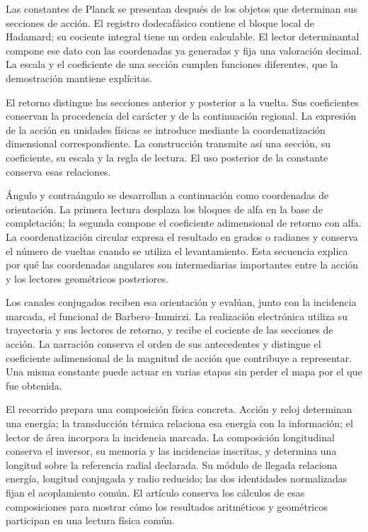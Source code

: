 
Las constantes de Planck se presentan después de los objetos que
determinan sus secciones de acción. El registro dodecafásico contiene el
bloque local de Hadamard; su cociente integral tiene un orden calculable.
El lector determinantal compone ese dato con las coordenadas ya generadas
y fija una valoración decimal. La escala y el coeficiente de una sección
cumplen funciones diferentes, que la demostración mantiene explícitas.

El retorno distingue las secciones anterior y posterior a la vuelta.
Sus coeficientes conservan la procedencia del carácter y de la
continuación regional. La expresión de la acción en unidades físicas
se introduce mediante la coordenatización dimensional correspondiente. La
construcción transmite así una sección, su coeficiente, su escala y la
regla de lectura. El uso posterior de la constante conserva esas
relaciones.

Ángulo y contraángulo se desarrollan a continuación como coordenadas de
orientación. La primera lectura desplaza los bloques de alfa en la base
de completación; la segunda compone el coeficiente adimensional de
retorno con alfa. La coordenatización circular expresa el resultado en grados o
radianes y conserva el número de vueltas cuando se utiliza el
levantamiento. Esta secuencia explica por qué las coordenadas angulares
son intermediarias importantes entre la acción y los lectores
geométricos posteriores.

Los canales conjugados reciben esa orientación y evalúan, junto con
la incidencia marcada, el funcional de Barbero--Immirzi.
La realización electrónica utiliza su trayectoria y sus lectores de
retorno, y recibe el cociente de las secciones de acción. La narración conserva
el orden de sus antecedentes y distingue el coeficiente adimensional
de la magnitud de acción que contribuye a representar. Una misma
constante puede actuar en varias etapas sin perder el mapa por el que
fue obtenida.

El recorrido prepara una composición física concreta. Acción y reloj
determinan una energía; la transducción térmica relaciona esa energía
con la información; el lector de área incorpora la incidencia marcada.
La composición longitudinal conserva el inversor, su memoria y las
incidencias inscritas, y determina una longitud sobre la referencia
radial declarada. Su módulo de llegada relaciona energía, longitud
conjugada y radio reducido; las dos identidades normalizadas fijan el
acoplamiento común. El artículo conserva los cálculos de esas composiciones para
mostrar cómo los resultados aritméticos y geométricos participan en
una lectura física común.
